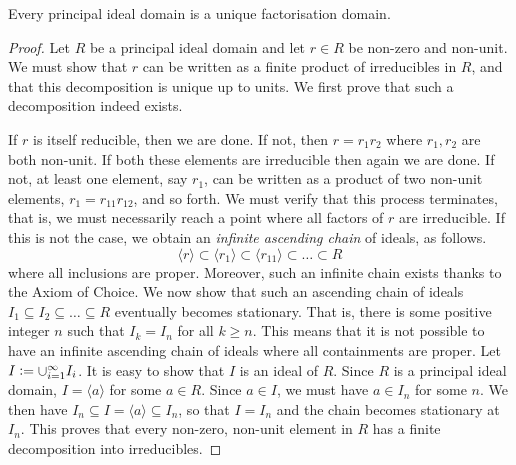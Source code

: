 \begin{theorem} \label{thm:PID-is-UFD}
    Every principal ideal domain is a unique factorisation domain.
\end{theorem}
\begin{proof}
    Let $R$ be a principal ideal domain and let $r \in R$ be non-zero and non-unit. We must show that $r$ can be written as a finite product of irreducibles in $R$, and that this decomposition is unique up to units. We first prove that such a decomposition indeed exists.
    
    If $r$ is itself reducible, then we are done. If not, then $r = r_1 r_2$ where $r_1, r_2$ are both non-unit. If both these elements are irreducible then again we are done. If not, at least one element, say $r_1$, can be written as a product of two non-unit elements, $r_1 = r_{11} r_{12}$, and so forth. We must verify that this process terminates, that is, we must necessarily reach a point where all factors of $r$ are irreducible. If this is not the case, we obtain an \emph{infinite ascending chain} of ideals, as follows.
    \[
        \langle r \rangle \subset \langle r_1 \rangle \subset \langle r_{11} \rangle \subset \ldots \subset R
    \]
    where all inclusions are proper. Moreover, such an infinite chain exists thanks to the Axiom of Choice. We now show that such an ascending chain of ideals $I_1 \subseteq I_2 \subseteq \ldots \subseteq R$ eventually becomes stationary. That is, there is some positive integer $n$ such that $I_k = I_n$ for all $k \geq n$. This means that it is not possible to have an infinite ascending chain of ideals where all containments are proper. Let $I \vcentcolon= \cup_{i=1}^{\infty} I_i$. It is easy to show that $I$ is an ideal of $R$. Since $R$ is a principal ideal domain, $I = \langle a \rangle$ for some $a \in R$. Since $a \in I$, we must have $a \in I_n$ for some $n$. We then have $I_n \subseteq I = \langle a \rangle \subseteq I_n$, so that $I = I_n$ and the chain becomes stationary at $I_n$. This proves that every non-zero, non-unit element in $R$ has a finite decomposition into irreducibles.
    

\end{proof}
